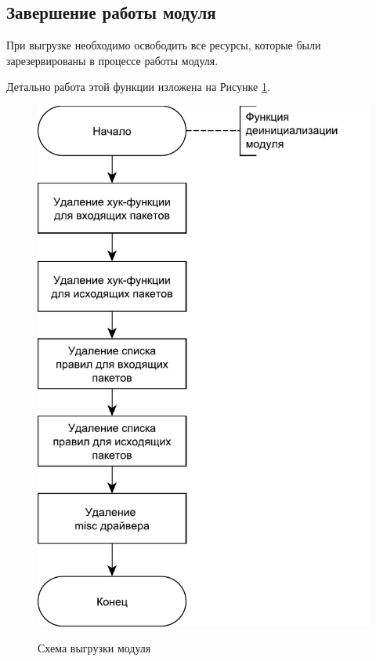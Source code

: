 \newpage

\subsection{Завершение работы модуля}
При выгрузке необходимо освободить все ресурсы, которые были зарезервированы в процессе работы модуля. 

Детально работа этой функции изложена на Рисунке \ref{fig4:image}.
\begin{figure}[h!]
	\begin{center}
		{\includegraphics[scale = 0.6]{img/exit.pdf}}
		\caption{Схема выгрузки модуля}
		\label{fig4:image}
	\end{center}
\end{figure}

